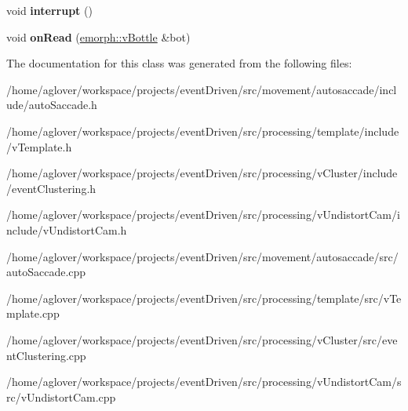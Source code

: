 \begin{DoxyCompactItemize}
\item 
\hypertarget{classEventBottleManager_a15152f9daa40714334c2da3871f959a9}{void {\bfseries interrupt} ()}\label{classEventBottleManager_a15152f9daa40714334c2da3871f959a9}

\item 
\hypertarget{classEventBottleManager_a9571d64d4640ef5a38f03a286d27425e}{void {\bfseries on\-Read} (\hyperlink{classemorph_1_1vBottle}{emorph\-::v\-Bottle} \&bot)}\label{classEventBottleManager_a9571d64d4640ef5a38f03a286d27425e}

\end{DoxyCompactItemize}


The documentation for this class was generated from the following files\-:\begin{DoxyCompactItemize}
\item 
/home/aglover/workspace/projects/event\-Driven/src/movement/autosaccade/include/auto\-Saccade.\-h\item 
/home/aglover/workspace/projects/event\-Driven/src/processing/template/include/v\-Template.\-h\item 
/home/aglover/workspace/projects/event\-Driven/src/processing/v\-Cluster/include/event\-Clustering.\-h\item 
/home/aglover/workspace/projects/event\-Driven/src/processing/v\-Undistort\-Cam/include/v\-Undistort\-Cam.\-h\item 
/home/aglover/workspace/projects/event\-Driven/src/movement/autosaccade/src/auto\-Saccade.\-cpp\item 
/home/aglover/workspace/projects/event\-Driven/src/processing/template/src/v\-Template.\-cpp\item 
/home/aglover/workspace/projects/event\-Driven/src/processing/v\-Cluster/src/event\-Clustering.\-cpp\item 
/home/aglover/workspace/projects/event\-Driven/src/processing/v\-Undistort\-Cam/src/v\-Undistort\-Cam.\-cpp\end{DoxyCompactItemize}
